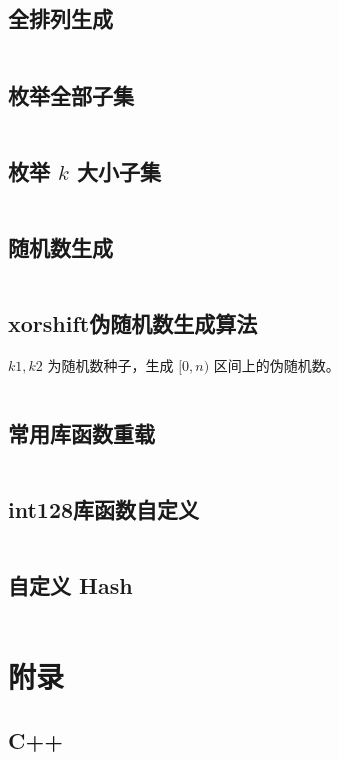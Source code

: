 \documentclass[a4paper, twoside]{article}
\begin{document}
\subsection{全排列生成}
\inputminted{cpp}{../src/杂项/全排列生成.cpp}

\subsection{枚举全部子集}
\inputminted{cpp}{../src/杂项/枚举全部子集.cpp}

\subsection{枚举 $k$ 大小子集}
\inputminted{cpp}{../src/杂项/枚举k大小子集.cpp}

\subsection{随机数生成}
\inputminted{cpp}{../src/杂项/随机数生成.cpp}

\subsection{xorshift伪随机数生成算法}
$k1, k2$ 为随机数种子，生成 $[0, n)$ 区间上的伪随机数。
\inputminted{cpp}{../src/杂项/xorshift伪随机数生成算法.cpp}

\subsection{常用库函数重载}
\inputminted{cpp}{../src/杂项/常用库函数重载.cpp}

\subsection{int128库函数自定义}
\inputminted{cpp}{../src/杂项/int128库函数自定义.cpp}

\subsection{自定义 Hash}
\inputminted{cpp}{../src/杂项/自定义Hash.cpp}

\newpage
\section{附录}
\subsection{C++}
\end{document}
